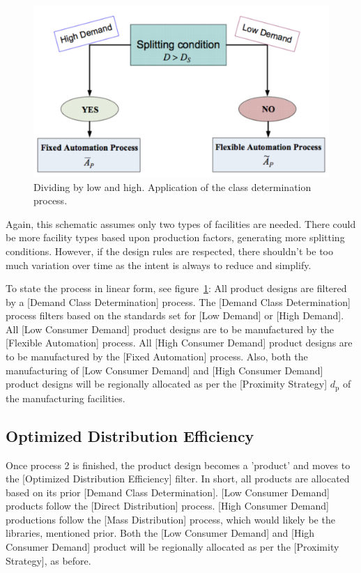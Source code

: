 \documentclass[10pt, a4paper, cleardoubleempty, openright, twoside]{book}
\begin{document}
\begin{figure}[bt!]
	\includegraphics[width=\textwidth]{figures/class-determination-process.pdf}
	\caption{Dividing by low and high. Application of the class determination process.}
	\label{fig:classDeterminationProcess}
\end{figure}

Again, this schematic assumes only two types of facilities are needed.
There could be more facility types based upon production factors,
generating more splitting conditions. However, if the design rules are
respected, there shouldn't be too much variation over time as the intent
is always to reduce and simplify.

To state the process in linear form, see
figure~\ref{fig:classDeterminationProcess}:
All product designs are filtered by a [Demand Class Determination]
process. The [Demand Class Determination] process filters based on the
standards set for [Low Demand] or [High Demand]. All [Low Consumer
Demand] product designs are to be manufactured by the [Flexible
Automation] process. All [High Consumer Demand] product designs are to
be manufactured by the [Fixed Automation] process. Also, both the
manufacturing of [Low Consumer Demand] and [High Consumer Demand]
product designs will be regionally allocated as per the [Proximity
Strategy] $d_\text{p}$ of the manufacturing facilities.

\subsection {Optimized Distribution Efficiency}

Once process 2 is finished, the product design becomes a 'product' and
moves to the [Optimized Distribution Efficiency] filter. In short, all
products are allocated based on its prior [Demand Class Determination].
[Low Consumer Demand] products follow the [Direct Distribution] process.
[High Consumer Demand] productions follow the [Mass Distribution]
process, which would likely be the libraries, mentioned prior. Both the
[Low Consumer Demand] and [High Consumer Demand] product will be
regionally allocated as per the [Proximity Strategy], as before. 
\end{document}

